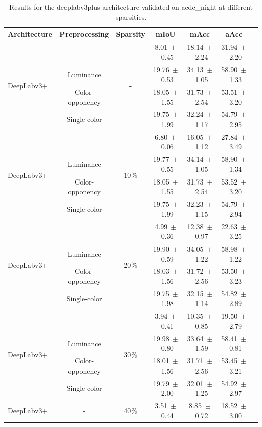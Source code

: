 \begin{table}[h]
\centering
\caption{Results for the deeplabv3plus architecture validated on acdc_night at different sparsities.}
\begin{tabular}{@{}lccc ccc@{}}
\toprule
Architecture & Preprocessing & Sparsity & mIoU & mAcc & aAcc \\
\midrule

\multirow{4}{*}{DeepLabv3+} & - & \multirow{4}{*}{-} & 8.01~$\pm$~0.45 & 18.14~$\pm$~2.24 & 31.94~$\pm$~2.20 \\
& Luminance & & 19.76~$\pm$~0.53 & 34.13~$\pm$~1.05 & 58.90~$\pm$~1.33 \\
& Color-opponency & & 18.05~$\pm$~1.55 & 31.73~$\pm$~2.54 & 53.51~$\pm$~3.20 \\
& Single-color & & 19.75~$\pm$~1.99 & 32.24~$\pm$~1.17 & 54.79~$\pm$~2.95 \\
\midrule
\multirow{4}{*}{DeepLabv3+} & - & \multirow{4}{*}{10\%} & 6.80~$\pm$~0.06 & 16.05~$\pm$~1.12 & 27.84~$\pm$~3.49 \\
& Luminance & & 19.77~$\pm$~0.55 & 34.14~$\pm$~1.05 & 58.90~$\pm$~1.34 \\
& Color-opponency & & 18.05~$\pm$~1.55 & 31.73~$\pm$~2.54 & 53.52~$\pm$~3.20 \\
& Single-color & & 19.75~$\pm$~1.99 & 32.23~$\pm$~1.15 & 54.79~$\pm$~2.94 \\
\midrule
\multirow{4}{*}{DeepLabv3+} & - & \multirow{4}{*}{20\%} & 4.99~$\pm$~0.36 & 12.38~$\pm$~0.97 & 22.63~$\pm$~3.25 \\
& Luminance & & 19.90~$\pm$~0.59 & 34.05~$\pm$~1.22 & 58.98~$\pm$~1.22 \\
& Color-opponency & & 18.03~$\pm$~1.56 & 31.72~$\pm$~2.56 & 53.50~$\pm$~3.23 \\
& Single-color & & 19.75~$\pm$~1.98 & 32.15~$\pm$~1.14 & 54.82~$\pm$~2.89 \\
\midrule
\multirow{4}{*}{DeepLabv3+} & - & \multirow{4}{*}{30\%} & 3.94~$\pm$~0.41 & 10.35~$\pm$~0.85 & 19.50~$\pm$~2.79 \\
& Luminance & & 19.98~$\pm$~0.80 & 33.64~$\pm$~1.59 & 58.41~$\pm$~0.81 \\
& Color-opponency & & 18.01~$\pm$~1.56 & 31.71~$\pm$~2.56 & 53.45~$\pm$~3.21 \\
& Single-color & & 19.79~$\pm$~2.00 & 32.01~$\pm$~1.25 & 54.92~$\pm$~2.97 \\
\midrule
\multirow{4}{*}{DeepLabv3+} & - & \multirow{4}{*}{40\%} & 3.51~$\pm$~0.44 & 8.85~$\pm$~0.72 & 18.52~$\pm$~3.00 \\

\end{tabular}
\end{table}
